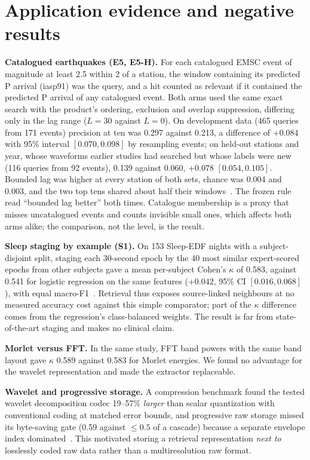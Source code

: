 \documentclass[sigconf,nonacm]{acmart}
\begin{document}
\section{Application evidence and negative results}\label{sec:negative}
\textbf{Catalogued earthquakes (E5, E5-H).} For each catalogued EMSC event of magnitude at least 2.5 within 2\textdegree{} of a station, the window containing its predicted P arrival (iasp91) was the query, and a hit counted as relevant if it contained the predicted P arrival of any catalogued event. Both arms used the same exact search with the product's ordering, exclusion and overlap suppression, differing only in the lag range ($L=30$ against $L=0$). On development data (465 queries from 171 events) precision at ten was 0.297 against 0.213, a difference of $+0.084$ with 95\% interval $[0.070, 0.098]$ by resampling events; on held-out stations and year, whose waveforms earlier studies had searched but whose labels were new (116 queries from 92 events), 0.139 against 0.060, $+0.078$ $[0.054, 0.105]$. Bounded lag was higher at every station of both sets, chance was 0.004 and 0.003, and the two top tens shared about half their windows~\cite{e5}. The frozen rule read ``bounded lag better'' both times. Catalogue membership is a proxy that misses uncatalogued events and counts invisible small ones, which affects both arms alike; the comparison, not the level, is the result.

\textbf{Sleep staging by example (S1).} On 153 Sleep-EDF nights with a subject-disjoint split, staging each 30-second epoch by the 40 most similar expert-scored epochs from other subjects gave a mean per-subject Cohen's $\kappa$ of 0.583, against 0.541 for logistic regression on the same features ($+0.042$, 95\% CI $[0.016, 0.068]$), with equal macro-F1~\cite{sleep}. Retrieval thus exposes source-linked neighbours at no measured accuracy cost against this simple comparator; part of the $\kappa$ difference comes from the regression's class-balanced weights. The result is far from state-of-the-art staging and makes no clinical claim.

\textbf{Morlet versus FFT.} In the same study, FFT band powers with the same band layout gave $\kappa$ 0.589 against 0.583 for Morlet energies. We found no advantage for the wavelet representation and made the extractor replaceable.

\textbf{Wavelet and progressive storage.} A compression benchmark found the tested wavelet decomposition codec 19--57\% \emph{larger} than scalar quantization with conventional coding at matched error bounds, and progressive raw storage missed its byte-saving gate (0.59 against $\le 0.5$ of a cascade) because a separate envelope index dominated~\cite{compression}. This motivated storing a retrieval representation \emph{next to} losslessly coded raw data rather than a multiresolution raw format.
\end{document}
